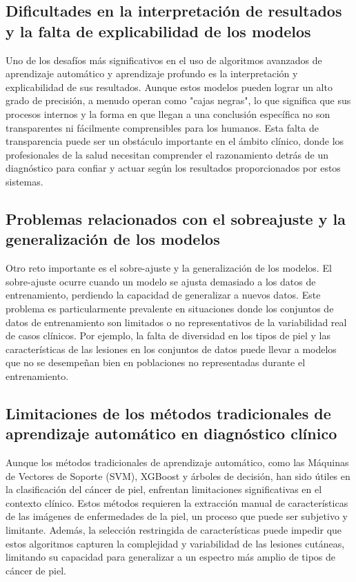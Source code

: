 \subsection{Dificultades en la interpretación de resultados y la falta de explicabilidad de los modelos}

Uno de los desafíos más significativos en el uso de algoritmos avanzados de aprendizaje automático y aprendizaje profundo es la interpretación y explicabilidad de sus resultados. Aunque estos modelos pueden lograr un alto grado de precisión, a menudo operan como "cajas negras", lo que significa que sus procesos internos y la forma en que llegan a una conclusión específica no son transparentes ni fácilmente comprensibles para los humanos. Esta falta de transparencia puede ser un obstáculo importante en el ámbito clínico, donde los profesionales de la salud necesitan comprender el razonamiento detrás de un diagnóstico para confiar y actuar según los resultados proporcionados por estos sistemas. 


\subsection{Problemas relacionados con el sobreajuste y la generalización de los modelos}
Otro reto importante es el sobre-ajuste y la generalización de los modelos. El sobre-ajuste ocurre cuando un modelo se ajusta demasiado a los datos de entrenamiento, perdiendo la capacidad de generalizar a nuevos datos. Este problema es particularmente prevalente en situaciones donde los conjuntos de datos de entrenamiento son limitados o no representativos de la variabilidad real de casos clínicos. Por ejemplo, la falta de diversidad en los tipos de piel y las características de las lesiones en los conjuntos de datos puede llevar a modelos que no se desempeñan bien en poblaciones no representadas durante el entrenamiento. 

\subsection{Limitaciones de los métodos tradicionales de aprendizaje automático en diagnóstico clínico}
Aunque los métodos tradicionales de aprendizaje automático, como las Máquinas de Vectores de Soporte (SVM), XGBoost y árboles de decisión, han sido útiles en la clasificación del cáncer de piel, enfrentan limitaciones significativas en el contexto clínico. Estos métodos requieren la extracción manual de características de las imágenes de enfermedades de la piel, un proceso que puede ser subjetivo y limitante. Además, la selección restringida de características puede impedir que estos algoritmos capturen la complejidad y variabilidad de las lesiones cutáneas, limitando su capacidad para generalizar a un espectro más amplio de tipos de cáncer de piel. 

